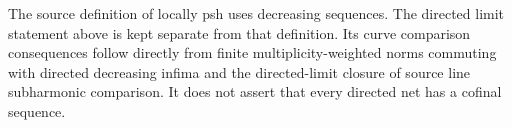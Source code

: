 \begin{remark}
\label{rmk:fc-directed-pl-source-relation}
The source definition of locally psh uses decreasing sequences. The directed
limit statement above is kept separate from that definition. Its curve
comparison consequences follow directly from finite multiplicity-weighted
norms commuting with directed decreasing infima and the directed-limit
closure of source line subharmonic comparison. It does not assert that every
directed net has a cofinal sequence.
\end{remark}
